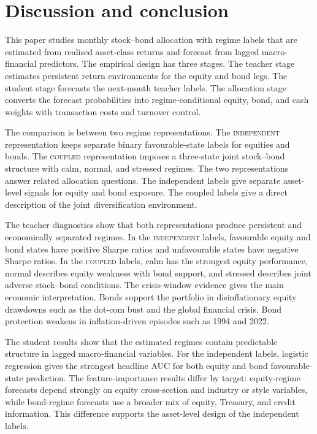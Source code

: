 \documentclass[10pt]{article}
\newcommand{\Acoup}{\textsc{coupled}}
\newcommand{\Bindep}{\textsc{independent}}
\begin{document}
\section{Discussion and conclusion}
\label{sec:conclusion}

This paper studies monthly stock--bond allocation with regime labels that are estimated from realised asset-class returns and forecast from lagged macro-financial predictors. The empirical design has three stages. The teacher stage estimates persistent return environments for the equity and bond legs. The student stage forecasts the next-month teacher labels. The allocation stage converts the forecast probabilities into regime-conditional equity, bond, and cash weights with transaction costs and turnover control.

The comparison is between two regime representations. The \Bindep{} representation keeps separate binary favourable-state labels for equities and bonds. The \Acoup{} representation imposes a three-state joint stock--bond structure with calm, normal, and stressed regimes. The two representations answer related allocation questions. The independent labels give separate asset-level signals for equity and bond exposure. The coupled labels give a direct description of the joint diversification environment.

The teacher diagnostics show that both representations produce persistent and economically separated regimes. In the \Bindep{} labels, favourable equity and bond states have positive Sharpe ratios and unfavourable states have negative Sharpe ratios. In the \Acoup{} labels, calm has the strongest equity performance, normal describes equity weakness with bond support, and stressed describes joint adverse stock--bond conditions. The crisis-window evidence gives the main economic interpretation. Bonds support the portfolio in disinflationary equity drawdowns such as the dot-com bust and the global financial crisis. Bond protection weakens in inflation-driven episodes such as 1994 and 2022.

The student results show that the estimated regimes contain predictable structure in lagged macro-financial variables. For the independent labels, logistic regression gives the strongest headline AUC for both equity and bond favourable-state prediction. The feature-importance results differ by target: equity-regime forecasts depend strongly on equity cross-section and industry or style variables, while bond-regime forecasts use a broader mix of equity, Treasury, and credit information. This difference supports the asset-level design of the independent labels.
\end{document}
